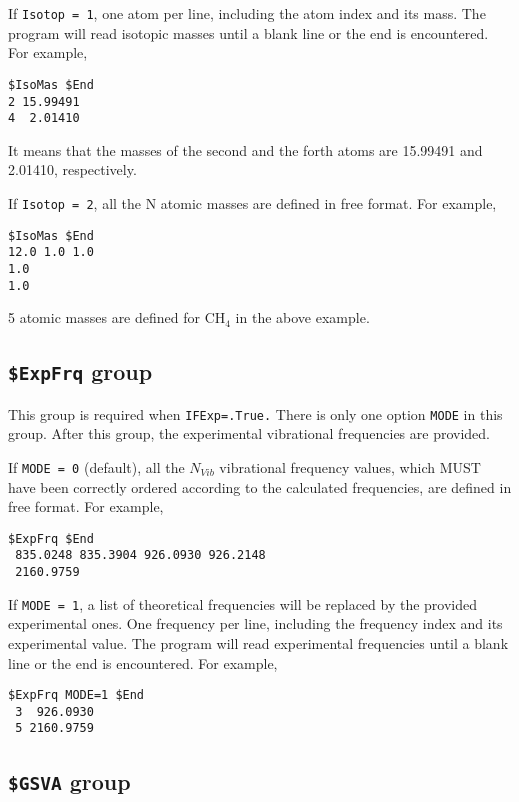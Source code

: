 \documentclass[12pt,english]{extarticle}
\begin{document}
\bigskip{}
If \verb|Isotop = 1|, one atom per line, including the atom index and its
mass. The program will read isotopic masses until a blank line or
the end is encountered. For example,
\begin{Verbatim}[frame=single]
 $IsoMas $End
2 15.99491
4  2.01410
\end{Verbatim}
It means that the masses of the second and the forth atoms are 15.99491 and
2.01410, respectively.

\bigskip{}
If \verb|Isotop = 2|, all the N atomic masses are defined in free format.
For example,
\begin{Verbatim}[frame=single]
 $IsoMas $End
12.0 1.0 1.0
1.0
1.0
\end{Verbatim}
5 atomic masses are defined for CH$_4$ in the above example.


\subsection{\texttt{\$ExpFrq} group} \label{sec:inp-expfrq}

This group is required when \verb|IFExp=.True.| There is only one option
\verb|MODE| in this group. After this group, the experimental vibrational
frequencies are provided.

\bigskip{}
If \verb|MODE = 0| (default), all the $N_{Vib}$ vibrational frequency values, which MUST have been correctly
ordered according to the calculated frequencies, are defined in free format. For example,
\begin{Verbatim}[frame=single]
 $ExpFrq $End
 835.0248 835.3904 926.0930 926.2148
 2160.9759
\end{Verbatim}

If \verb|MODE = 1|, a list of theoretical frequencies will be replaced by
the provided experimental ones. One frequency per line, including the
frequency index and its experimental value. The program will
read experimental frequencies until a blank line or the end is encountered.
For example,
\begin{Verbatim}[frame=single]
 $ExpFrq MODE=1 $End
 3  926.0930
 5 2160.9759
\end{Verbatim}



\subsection{\texttt{\$GSVA} group} \label{sec:inp-gsva}
\end{document}
